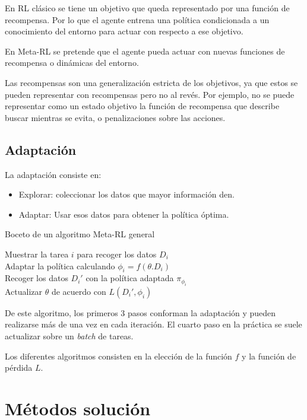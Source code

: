 En RL clásico se tiene un objetivo que queda representado por una función de recompensa. Por lo
que el agente entrena una política condicionada a un conocimiento del entorno para actuar
con respecto a ese objetivo.

En Meta-RL se pretende que el agente pueda actuar con nuevas funciones de recompensa o
dinámicas del entorno.

Las recompensas son una generalización estricta de los objetivos, ya que estos se pueden
representar con recompensas pero no al revés. Por ejemplo, no se puede representar como un
estado objetivo la función de recompensa que describe buscar mientras se evita, o
penalizaciones sobre las acciones.

\subsection{Adaptación}%
\label{sub:adaptación}

La adaptación consiste en:
\begin{itemize}
    \item Explorar: coleccionar los datos que mayor información den.
    \item Adaptar: Usar esos datos para obtener la política óptima.
\end{itemize}

\begin{algorithm}
    \caption{Boceto de un algoritmo Meta-RL general}
    Muestrar la tarea $i$ para recoger los datos $D_i$ \\
    Adaptar la política calculando $\phi_i=f(\theta.D_i)$ \\
    Recoger los datos $D_i'$ con la política adaptada $\pi_{\phi_i}$ \\
    Actualizar $\theta$ de acuerdo con $L(D_i',\phi_i)$
\end{algorithm}

De este algoritmo, los primeros 3 pasos conforman la adaptación y pueden realizarse más de
una vez en cada iteración. El cuarto paso en la práctica se suele actualizar sobre un
\textit{batch} de tareas.

Los diferentes algoritmos consisten en la elección de la función $f$ y la función de pérdida
$L$.

\section{Métodos solución}%
\label{sec:métodos_solución}

